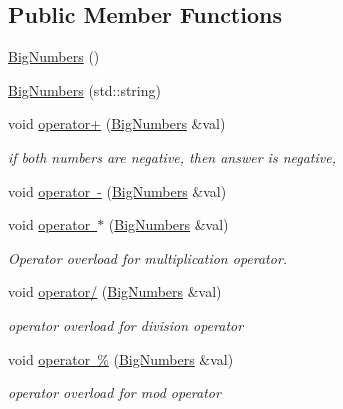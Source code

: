 \subsection*{Public Member Functions}
\begin{DoxyCompactItemize}
\item 
\mbox{\hyperlink{class_big_numbers_1_1_big_numbers_a87037d5faa0bf5253b6e8fc7fc54324c}{Big\+Numbers}} ()
\item 
\mbox{\hyperlink{class_big_numbers_1_1_big_numbers_a4dcfaac3c63a377ef04a6b5e6bd2fc68}{Big\+Numbers}} (std\+::string)
\item 
void \mbox{\hyperlink{class_big_numbers_1_1_big_numbers_a45b596b4ef24a3c7fb71312d52eb187d}{operator+}} (\mbox{\hyperlink{class_big_numbers_1_1_big_numbers}{Big\+Numbers}} \&val)
\begin{DoxyCompactList}\small\item\em if both numbers are negative, then answer is negative, \end{DoxyCompactList}\item 
void \mbox{\hyperlink{class_big_numbers_1_1_big_numbers_a3a11a7f18fd3983fb9e2cea2d0a339a4}{operator -\/}} (\mbox{\hyperlink{class_big_numbers_1_1_big_numbers}{Big\+Numbers}} \&val)
\item 
void \mbox{\hyperlink{class_big_numbers_1_1_big_numbers_af6a504d7e4222d7f40484cdf178b725e}{operator $\ast$}} (\mbox{\hyperlink{class_big_numbers_1_1_big_numbers}{Big\+Numbers}} \&val)
\begin{DoxyCompactList}\small\item\em Operator overload for multiplication operator. \end{DoxyCompactList}\item 
void \mbox{\hyperlink{class_big_numbers_1_1_big_numbers_a2522e10c451d226125cf7c1287797810}{operator/}} (\mbox{\hyperlink{class_big_numbers_1_1_big_numbers}{Big\+Numbers}} \&val)
\begin{DoxyCompactList}\small\item\em operator overload for division operator \end{DoxyCompactList}\item 
void \mbox{\hyperlink{class_big_numbers_1_1_big_numbers_ac5833fce77ce6d97d336b60a3577d9ae}{operator \%}} (\mbox{\hyperlink{class_big_numbers_1_1_big_numbers}{Big\+Numbers}} \&val)
\begin{DoxyCompactList}\small\item\em operator overload for mod operator \end{DoxyCompactList}\item 

\end{DoxyCompactItemize}
